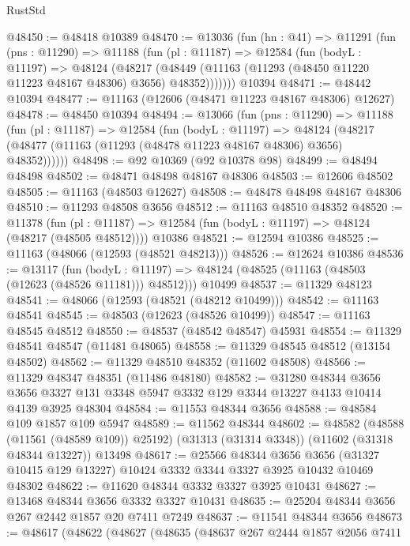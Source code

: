 \begin{lexlean}{RustStd}
\begin{coremodule}
@48450 := @48418 @10389
@48470 := @13036
    (fun (hn : @41) =>
    @11291
      (fun (pns : @11290) =>
      @11188
        (fun (pl : @11187) =>
        @12584
          (fun (bodyL : @11197) =>
          @48124
            (@48217
              (@48449 (@11163 (@11293 (@48450 @11220 @11223 @48167 @48306) @3656) @48352)))))))
    @10394
@48471 := @48442 @10394
@48477 := @11163 (@12606 (@48471 @11223 @48167 @48306) @12627)
@48478 := @48450 @10394
@48494 := @13066
    (fun (pns : @11290) =>
    @11188
      (fun (pl : @11187) =>
      @12584
        (fun (bodyL : @11197) =>
        @48124 (@48217 (@48477 (@11163 (@11293 (@48478 @11223 @48167 @48306) @3656) @48352))))))
@48498 := @92 @10369 (@92 @10378 @98)
@48499 := @48494 @48498
@48502 := @48471 @48498 @48167 @48306
@48503 := @12606 @48502
@48505 := @11163 (@48503 @12627)
@48508 := @48478 @48498 @48167 @48306
@48510 := @11293 @48508 @3656
@48512 := @11163 @48510 @48352
@48520 := @11378
    (fun (pl : @11187) => @12584 (fun (bodyL : @11197) => @48124 (@48217 (@48505 @48512))))
    @10386
@48521 := @12594 @10386
@48525 := @11163 (@48066 (@12593 (@48521 @48213)))
@48526 := @12624 @10386
@48536 := @13117
    (fun (bodyL : @11197) => @48124 (@48525 (@11163 (@48503 (@12623 (@48526 @11181))) @48512)))
    @10499
@48537 := @11329 @48123
@48541 := @48066 (@12593 (@48521 (@48212 @10499)))
@48542 := @11163 @48541
@48545 := @48503 (@12623 (@48526 @10499))
@48547 := @11163 @48545 @48512
@48550 := @48537 (@48542 @48547) @45931
@48554 := @11329 @48541 @48547 (@11481 @48065)
@48558 := @11329 @48545 @48512 (@13154 @48502)
@48562 := @11329 @48510 @48352 (@11602 @48508)
@48566 := @11329 @48347 @48351 (@11486 @48180)
@48582 := @31280
    @48344
    @3656
    @3656
    @3327
    @131
    @3348
    @5947
    @3332
    @129
    @3344
    @13227
    @4133
    @10414
    @4139
    @3925
    @48304
@48584 := @11553 @48344 @3656
@48588 := @48584 @109 @1857 @109 @5947
@48589 := @11562 @48344
@48602 := @48582
    (@48588 (@11561 (@48589 @109)) @25192)
    (@31313 (@31314 @3348))
    (@11602 (@31318 @48344 @13227))
    @13498
@48617 := @25566
    @48344
    @3656
    @3656
    (@31327 @10415 @129 @13227)
    @10424
    @3332
    @3344
    @3327
    @3925
    @10432
    @10469
    @48302
@48622 := @11620 @48344 @3332 @3327 @3925 @10431
@48627 := @13468 @48344 @3656 @3332 @3327 @10431
@48635 := @25204 @48344 @3656 @267 @2442 @1857 @20 @7411 @7249
@48637 := @11541 @48344 @3656
@48673 := @48617
    (@48622
      (@48627
        (@48635
          (@48637
            @267
            @2444
            @1857
            @2056
            @7411

\end{coremodule}
\end{lexlean}
